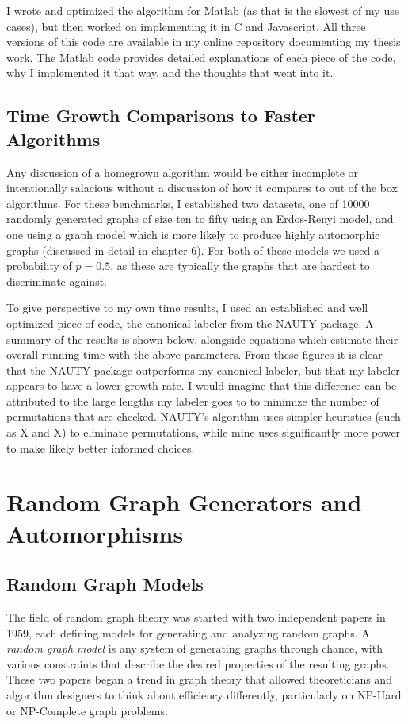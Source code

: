 \documentclass[11pt,a4paper]{report}
\begin{document}
I wrote and optimized the algorithm for Matlab (as that is the slowest of my use cases), but then worked on implementing it in C and Javascript.
All three versions of this code are available in my online repository documenting my thesis work.
The Matlab code provides detailed explanations of each piece of the code, why I implemented it that way, and the thoughts that went into it.

\section{Time Growth Comparisons to Faster Algorithms}
Any discussion of a homegrown algorithm would be either incomplete or intentionally salacious without a discussion of how it compares to out of the box algorithms.
For these benchmarks, I established two datasets, one of 10000 randomly generated graphs of size ten to fifty using an Erdos-Renyi model, and one using a graph model which is more likely to produce highly automorphic graphs (discussed in detail in chapter 6).
For both of these models we used a probability of $p=0.5$, as these are typically the graphs that are hardest to discriminate against.

To give perspective to my own time results, I used an established and well optimized piece of code, the canonical labeler from the NAUTY package.
A summary of the results is shown below, alongside equations which estimate their overall running time with the above parameters.
From these figures it is clear that the NAUTY package outperforms my canonical labeler, but that my labeler appears to have a lower growth rate.
I would imagine that this difference can be attributed to the large lengths my labeler goes to to minimize the number of permutations that are checked.
NAUTY's algorithm uses simpler heuristics (such as X and X) to eliminate permutations, while mine uses significantly more power to make likely better informed choices.



\chapter{Random Graph Generators and Automorphisms}

\section{Random Graph Models}


The field of random graph theory was started with two independent papers in 1959, each defining models for generating and analyzing random graphs.
A \emph{random graph model} is any system of generating graphs through chance, with various constraints that describe the desired properties of the resulting graphs.
These two papers began a trend in graph theory that allowed theoreticians and algorithm designers to think about efficiency differently, particularly on NP-Hard or NP-Complete graph problems.
\end{document}
